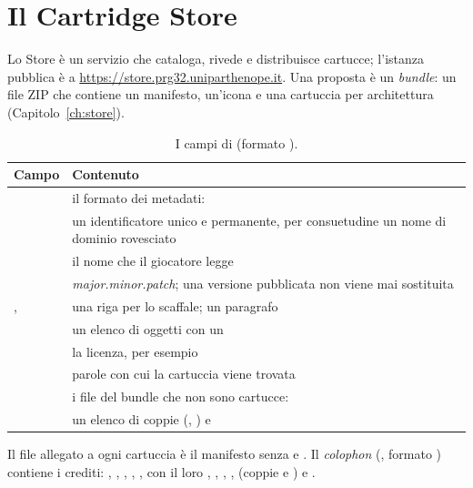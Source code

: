 \section{Il Cartridge Store}

Lo Store è un servizio che cataloga, rivede e distribuisce cartucce; l'istanza
pubblica è a \url{https://store.prg32.uniparthenope.it}. Una proposta è un
\emph{bundle}: un file ZIP che contiene un manifesto, un'icona e una cartuccia
per architettura (Capitolo~\ref{ch:store}).

\begin{table}[htb]
\centering\small
\caption{I campi di  (formato ).}\label{tab:prg:manifest}
\begin{tabularx}{\textwidth}{@{}lL@{}}
\toprule
\textbf{Campo} & \textbf{Contenuto}\\
\midrule
{} & il formato dei metadati: \\
 & un identificatore unico e permanente, per consuetudine un nome di dominio rovesciato\\
 & il nome che il giocatore legge\\
 & \emph{major.minor.patch}; una versione pubblicata non viene mai sostituita\\
,  & una riga per lo scaffale; un paragrafo\\
 & un elenco di oggetti con un \\
 & la licenza, per esempio \\
 & parole con cui la cartuccia viene trovata\\
 & i file del bundle che non sono cartucce: \\
 & un elenco di coppie  (, ) e \\
\bottomrule
\end{tabularx}
\end{table}

Il file  allegato a ogni cartuccia è il manifesto senza
 e . Il \emph{colophon}
(, formato ) contiene i crediti:
, , , ,
,  con il loro , ,
, ,  (coppie
 e ) e .


